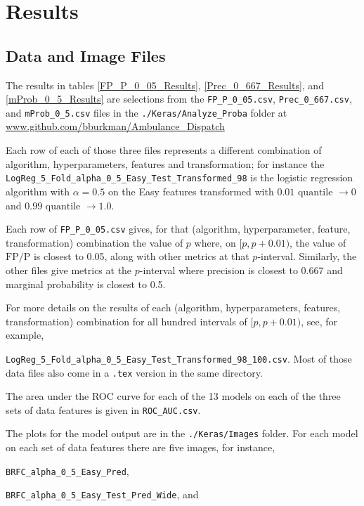 \section{Results}\label{Results}

\subsection{Data and Image Files}
\label{data_files}

The results in tables \ref{FP_P_0_05_Results}, \ref{Prec_0_667_Results}, and \ref{mProb_0_5_Results} are selections from the 
\verb|FP_P_0_05.csv|, 
\verb|Prec_0_667.csv|, and
\verb|mProb_0_5.csv| files in the 
\verb|./Keras/Analyze_Proba| folder at
\url{www.github.com/bburkman/Ambulance_Dispatch}

Each row of each of those three files represents a different combination of algorithm, hyperparameters, features and transformation; for instance the 
\verb|LogReg_5_Fold_alpha_0_5_Easy_Test_Transformed_98| is the logistic regression algorithm with $\alpha = 0.5$ on the Easy features transformed with $0.01 \text{ quantile } \to 0$ and $0.99 \text{ quantile } \to 1.0$.  

Each row of \verb|FP_P_0_05.csv| gives, for that (algorithm, hyperparameter, feature, transformation) combination the value of $p$ where, on $[p, p+0.01)$, the value of $\text{FP}/\text{P}$ is closest to 0.05, along with other metrics at that $p$-interval.  Similarly, the other files give metrics at the $p$-interval where precision is closest to 0.667 and marginal probability is closest to 0.5.  

For more details on the results of each (algorithm, hyperparameters, features, transformation) combination for all hundred intervals of $[p, p+0.01)$, see, for example, 

\noindent\verb|LogReg_5_Fold_alpha_0_5_Easy_Test_Transformed_98_100.csv|.  Most of those data files also come in a \verb|.tex| version in the same directory.  

The area under the ROC curve for each of the 13 models on each of the three sets of data features is given in \verb|ROC_AUC.csv|.

The plots for the model output are in the \verb|./Keras/Images| folder.  For each model on each set of data features there are five images, for instance, 

\verb|BRFC_alpha_0_5_Easy_Pred|,

\verb|BRFC_alpha_0_5_Easy_Test_Pred_Wide|, and

